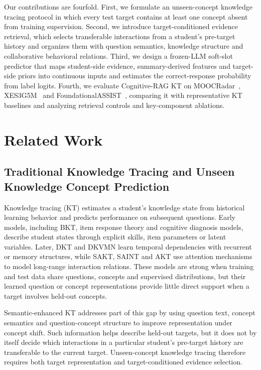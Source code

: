 \documentclass[a4paper,12pt]{article}
\numberwithin{table}{section}
\begin{document}
Our contributions are fourfold. First, we formulate an unseen-concept knowledge tracing protocol in which every test target contains at least one concept absent from training supervision. Second, we introduce target-conditioned evidence retrieval, which selects transferable interactions from a student's pre-target history and organizes them with question semantics, knowledge structure and collaborative behavioral relations. Third, we design a frozen-LLM soft-slot predictor that maps student-side evidence, summary-derived features and target-side priors into continuous inputs and estimates the correct-response probability from label logits. Fourth, we evaluate Cognitive-RAG KT on MOOCRadar~\citep{yu2023moocradar}, XES3G5M~\citep{liu2023xes3g5m} and FoundationalASSIST~\citep{worden2026foundationalassist}, comparing it with representative KT baselines and analyzing retrieval controls and key-component ablations.

\section{Related Work}

\subsection{Traditional Knowledge Tracing and Unseen Knowledge Concept Prediction}

Knowledge tracing (KT) estimates a student's knowledge state from historical learning behavior and predicts performance on subsequent questions. Early models, including BKT, item response theory and cognitive diagnosis models, describe student states through explicit skills, item parameters or latent variables\citep{corbett1995knowledge,chen2021irt,pavlik2009pfa,tatsuoka1983rulespace}. Later, DKT and DKVMN learn temporal dependencies with recurrent or memory structures, while SAKT, SAINT and AKT use attention mechanisms to model long-range interaction relations\citep{piech2015deep,zhang2017dynamic,pandey2019sakt,choi2020saint,ghosh2020akt}. These models are strong when training and test data share questions, concepts and supervised distributions, but their learned question or concept representations provide little direct support when a target involves held-out concepts.

Semantic-enhanced KT addresses part of this gap by using question text, concept semantics and question-concept structure to improve representation under concept shift\citep{fu2024sinkt}. Such information helps describe held-out targets, but it does not by itself decide which interactions in a particular student's pre-target history are transferable to the current target. Unseen-concept knowledge tracing therefore requires both target representation and target-conditioned evidence selection.
\end{document}
